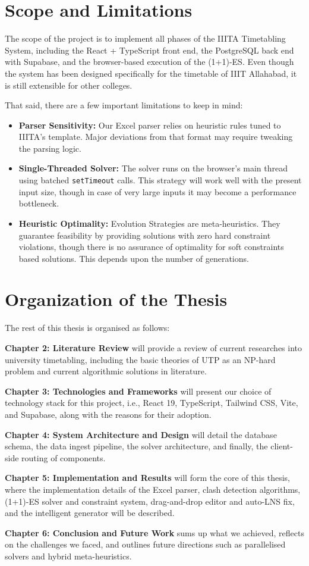 \section{Scope and Limitations}

The scope of the project is to implement all phases of the IIITA Timetabling System, including the React + TypeScript front end, the PostgreSQL back end with Supabase, and the browser-based execution of the (1+1)-ES. Even though the system has been designed specifically for the timetable of IIIT Allahabad, it is still extensible for other colleges.

That said, there are a few important limitations to keep in mind:
\begin{itemize}
    \item \textbf{Parser Sensitivity:} Our Excel parser relies on heuristic rules tuned to IIITA's template. Major deviations from that format may require tweaking the parsing logic.
    \item \textbf{Single-Threaded Solver:} The solver runs on the browser's main thread using batched \texttt{setTimeout} calls. This strategy will work well with the present input size, though in case of very large inputs it may become a performance bottleneck.
    \item \textbf{Heuristic Optimality:} Evolution Strategies are meta-heuristics. They guarantee feasibility by providing solutions with zero hard constraint violations, though there is no assurance of optimality for soft constraints based solutions. This depends upon the number of generations.
\end{itemize}

\section{Organization of the Thesis}

The rest of this thesis is organised as follows:

\textbf{Chapter 2: Literature Review} will provide a review of current researches into university timetabling, including the basic theories of UTP as an NP-hard problem and current algorithmic solutions in literature.

\textbf{Chapter 3: Technologies and Frameworks} will present our choice of technology stack for this project, i.e., React 19, TypeScript, Tailwind CSS, Vite, and Supabase, along with the reasons for their adoption.

\textbf{Chapter 4: System Architecture and Design} will detail the database schema, the data ingest pipeline, the solver architecture, and finally, the client-side routing of components.

\textbf{Chapter 5: Implementation and Results} will form the core of this thesis, where the implementation details of the Excel parser, clash detection algorithms, (1+1)-ES solver and constraint system, drag-and-drop editor and auto-LNS fix, and the intelligent generator will be described.

\textbf{Chapter 6: Conclusion and Future Work} sums up what we achieved, reflects on the challenges we faced, and outlines future directions such as parallelised solvers and hybrid meta-heuristics.
